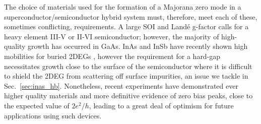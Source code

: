 The choice of materials used for the formation of a Majorana zero mode in a superconductor/semiconductor hybrid system must, therefore, meet each of these, sometimes
conflicting, requirements. A large SOI and Land\'e g-factor calls for a heavy element III-V or II-VI semiconductor; however, the majority of high-quality growth has occurred
in GaAs. InAs and InSb have recently shown high mobilities for buried 2DEGs \cite{PhysRevMaterials.2.104602,doi:10.1063/1.4993784}, however the requirement for a hard-gap necessitates growth close to the surface of the semiconductor where it is difficult to shield the 2DEG from scattering off surface impurities, an issue we
tackle in Sec.~\ref{sec:inas_hb}. Nonetheless, recent experiments have demonstrated ever higher quality materials and more definitive evidence of zero bias peaks, close
to the expected value of $2e^2/h$\cite{PhysRevLett.119.136803,nature26142}, leading to a great deal of optimism for future applications using such devices.

